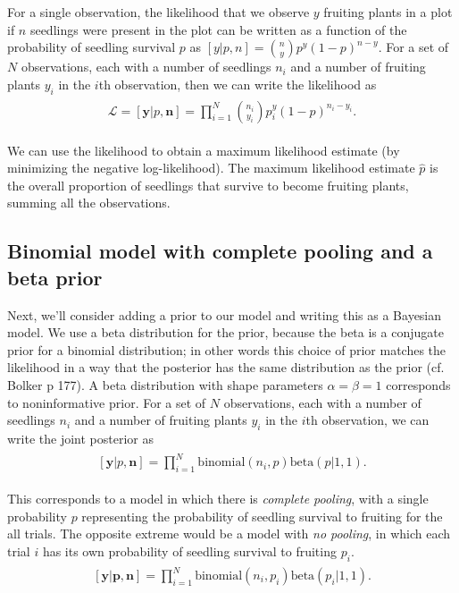 \documentclass[12pt, oneside, titlepage]{article}   	%
\begin{document}
For a single observation, the likelihood that we observe $y$ fruiting plants in a plot if $n$ seedlings were present in the plot can be written as a function of the probability of seedling survival $p$ as $[y|p,n] = \binom{n}{y}p^y(1-p)^{n-y}$. For a set of $N$ observations, each with a number of seedlings $n_i$ and a number of fruiting plants $y_i$ in the $i$th observation, then we can write the likelihood as
%
\begin{align}
  \begin{split}
\mathcal{L} = [\bm{y}|p,\bm{n}]  = \prod_{i=1}^N \binom{n_i}{y_i}p^y_i(1-p)^{n_i-y_i}.
  \end{split}
\end{align}

We can use the likelihood to obtain a maximum likelihood estimate (by minimizing the negative log-likelihood). The maximum likelihood estimate $\hat{p}$ is the overall proportion of seedlings that survive to become fruiting plants, summing all the observations. 

\subsection*{Binomial model with complete pooling and a beta prior}

Next, we'll consider adding a prior to our model and writing this as a Bayesian model. We use a beta distribution for the prior, because the beta is a conjugate prior for a binomial distribution; in other words this choice of prior matches the likelihood in a way that the posterior has the same distribution as the prior (cf. Bolker p 177). A beta distribution with shape parameters $\alpha=\beta=1$ corresponds to noninformative prior. For a set of $N$ observations, each with a number of seedlings $n_i$ and a number of fruiting plants $y_i$ in the $i$th observation, we can write the joint posterior as
%
\begin{align}
  \begin{split}
[\bm{y}|p,\bm{n}]  = \prod_{i=1}^N \mathrm{binomial}(n_i,p) \mathrm{beta} (  p | 1 , 1 ).
  \end{split}
\end{align}

This corresponds to a model in which there is \textit{complete pooling}, with a single probability $p$ representing the probability of seedling survival to fruiting for the all trials. The opposite extreme would be a model with \textit{no pooling}, in which each trial $i$ has its own probability of seedling survival to fruiting $p_i$. 
%
\begin{align}
  \begin{split}
[\bm{y}|\bm{p},\bm{n}]  = \prod_{i=1}^N \mathrm{binomial}(n_i,p_i) \mathrm{beta} (  p_i | 1 , 1 ).
  \end{split}
\end{align}
\end{document}

